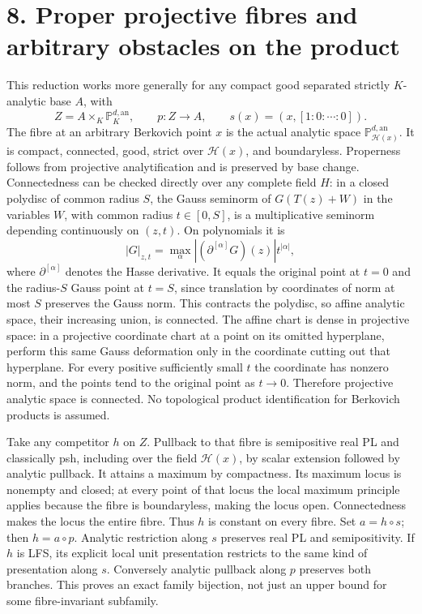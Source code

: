 \documentclass[11pt]{article}
\begin{document}
\section*{8. Proper projective fibres and arbitrary obstacles on the product}

This reduction works more generally for any compact good separated strictly \(K\)-analytic base \(A\), with
\[
Z=A\times_K\mathbb P^{d,\mathrm{an}}_K,\qquad p:Z\to A,
\qquad s(x)=(x,[1:0:\cdots:0]).
\]
The fibre at an arbitrary Berkovich point \(x\) is the actual analytic space \(\mathbb P^{d,\mathrm{an}}_{\mathcal H(x)}\). It is compact, connected, good, strict over \(\mathcal H(x)\), and boundaryless. Properness follows from projective analytification and is preserved by base change. Connectedness can be checked directly over any complete field \(H\): in a closed polydisc of common radius \(S\), the Gauss seminorm of \(G(T(z)+W)\) in the variables \(W\), with common radius \(t\in[0,S]\), is a multiplicative seminorm depending continuously on \((z,t)\). On polynomials it is
\[
|G|_{z,t}=\max_{\alpha}|(\partial^{[\alpha]}G)(z)|t^{|\alpha|},
\]
where \(\partial^{[\alpha]}\) denotes the Hasse derivative. It equals the original point at \(t=0\) and the radius-\(S\) Gauss point at \(t=S\), since translation by coordinates of norm at most \(S\) preserves the Gauss norm. This contracts the polydisc, so affine analytic space, their increasing union, is connected. The affine chart is dense in projective space: in a projective coordinate chart at a point on its omitted hyperplane, perform this same Gauss deformation only in the coordinate cutting out that hyperplane. For every positive sufficiently small \(t\) the coordinate has nonzero norm, and the points tend to the original point as \(t\to0\). Therefore projective analytic space is connected. No topological product identification for Berkovich products is assumed.

Take any competitor \(h\) on \(Z\). Pullback to that fibre is semipositive real PL and classically psh, including over the field \(\mathcal H(x)\), by scalar extension followed by analytic pullback. It attains a maximum by compactness. Its maximum locus is nonempty and closed; at every point of that locus the local maximum principle applies because the fibre is boundaryless, making the locus open. Connectedness makes the locus the entire fibre. Thus \(h\) is constant on every fibre. Set \(a=h\circ s\); then \(h=a\circ p\). Analytic restriction along \(s\) preserves real PL and semipositivity. If \(h\) is LFS, its explicit local unit presentation restricts to the same kind of presentation along \(s\). Conversely analytic pullback along \(p\) preserves both branches. This proves an exact family bijection, not just an upper bound for some fibre-invariant subfamily.
\end{document}
